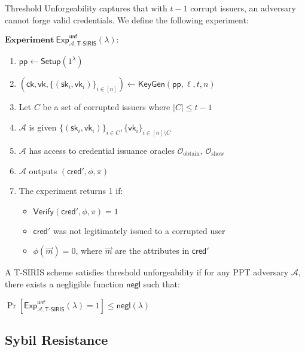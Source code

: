 \begin{definition}
Threshold Unforgeability captures that with $t-1$ corrupt issuers, an adversary cannot forge valid credentials. We define the following experiment:

$\textbf{Experiment}~\mathsf{Exp}^{\mathsf{unf}}_{\mathcal{A},\mathsf{T\text{-}SIRIS}}(\lambda):$
\begin{enumerate}
    \item $\mathsf{pp} \leftarrow \mathsf{Setup}(1^\lambda)$
    \item $(\mathsf{ck}, \mathsf{vk}, \{(\mathsf{sk}_i, \mathsf{vk}_i)\}_{i\in[n]}) \leftarrow \mathsf{KeyGen}(\mathsf{pp}, \ell, t, n)$
    \item Let $C$ be a set of corrupted issuers where $|C| \leq t-1$
    \item $\mathcal{A}$ is given $\{(\mathsf{sk}_i, \mathsf{vk}_i)\}_{i\in C}, \{\mathsf{vk}_i\}_{i\in[n]\setminus C}$
    \item $\mathcal{A}$ has access to credential issuance oracles $\mathcal{O}_{\text{obtain}},~\mathcal{O}_{\text{show}}$
    \item $\mathcal{A}$ outputs $(\mathsf{cred}', \phi, \pi)$
    \item The experiment returns 1 if:
    \begin{itemize}
        \item $\mathsf{Verify}(\mathsf{cred}', \phi, \pi) = 1$
        \item $\mathsf{cred}'$ was not legitimately issued to a corrupted user
        \item $\phi(\vec{m}) = 0$, where $\vec{m}$ are the attributes in $\mathsf{cred}'$
    \end{itemize}
\end{enumerate}

A T-SIRIS scheme satisfies threshold unforgeability if for any PPT adversary $\mathcal{A}$, there exists a negligible function $\mathsf{negl}$ such that:

$\Pr[\mathsf{Exp}^{\mathsf{unf}}_{\mathcal{A},\mathsf{T\text{-}SIRIS}}(\lambda) = 1] \leq \mathsf{negl}(\lambda)$
\end{definition}








\subsection{Sybil Resistance}

